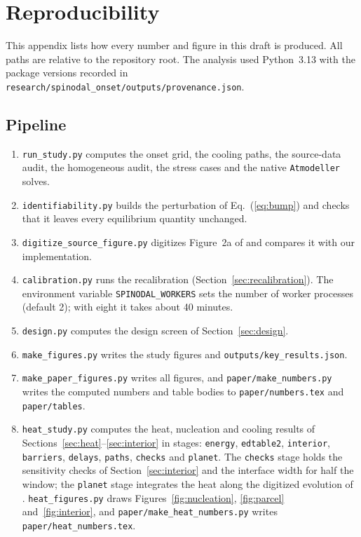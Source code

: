 \chapter{Reproducibility}\label{app:repro}

This appendix lists how every number and figure in this draft is produced. All paths are
relative to the repository root. The analysis used Python~3.13 with the package versions
recorded in \texttt{research/spinodal\_onset/outputs/provenance.json}.

\section{Pipeline}

\begin{enumerate}
\item \texttt{run\_study.py} computes the onset grid, the cooling paths, the source-data audit,
the homogeneous audit, the stress cases and the native \texttt{Atmodeller} solves.
\item \texttt{identifiability.py} builds the perturbation of Eq.~(\ref{eq:bump}) and checks that
it leaves every equilibrium quantity unchanged.
\item \texttt{digitize\_source\_figure.py} digitizes Figure~2a of \cite{gilmore2026} and compares
it with our implementation.
\item \texttt{calibration.py} runs the recalibration (Section~\ref{sec:recalibration}). The
environment variable \texttt{SPINODAL\_WORKERS} sets the number of worker processes (default 2);
with eight it takes about 40 minutes.
\item \texttt{design.py} computes the design screen of Section~\ref{sec:design}.
\item \texttt{make\_figures.py} writes the study figures and \texttt{outputs/key\_results.json}.
\item \texttt{make\_paper\_figures.py} writes all figures, and \texttt{paper/make\_numbers.py}
writes the computed numbers and table bodies to \texttt{paper/numbers.tex} and
\texttt{paper/tables}.
\item \texttt{heat\_study.py} computes the heat, nucleation and cooling results of
Sections~\ref{sec:heat}--\ref{sec:interior} in stages: \texttt{energy}, \texttt{edtable2},
\texttt{interior}, \texttt{barriers}, \texttt{delays}, \texttt{paths}, \texttt{checks} and
\texttt{planet}. The \texttt{checks} stage holds the sensitivity checks of
Section~\ref{sec:interior} and the interface width for half the window; the \texttt{planet}
stage integrates the heat along the digitized evolution of \cite{rogers2025}. \texttt{heat\_figures.py} draws Figures~\ref{fig:nucleation},
\ref{fig:parcel} and~\ref{fig:interior}, and \texttt{paper/make\_heat\_numbers.py} writes
\texttt{paper/heat\_numbers.tex}.
\end{enumerate}

